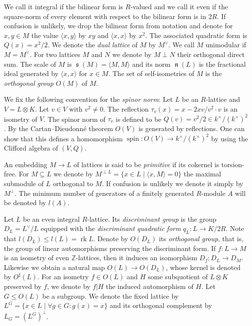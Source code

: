 \documentclass[a4paper]{amsart}
\theoremstyle{definition}
\theoremstyle{plain}
\DeclareMathOperator{\rk}{rk}
\DeclareMathOperator{\scale}{\mathfrak{s}}
\DeclareMathOperator{\norm}{\mathfrak{n}}
\newcommand{\ZZ}{\mathbb{Z}}
\newcommand{\disc}[1]{{D_{#1}}}
\DeclareMathOperator{\spin}{spin}
\newcommand{\sprodb}[2]{\langle #1, #2 \rangle}
\newcommand{\sprodbq}[1]{\langle #1, #1 \rangle}
\begin{document}
We call it integral if the bilinear form is $R$-valued and we call it even if the square-norm of every element with respect to the bilinear form is in $2 R$. 
If confusion is unlikely, we drop the bilinear form from notation and denote for $x,y \in M$ the value
$\sprodb{x}{y}$ by $xy$ and $\sprodbq{x}$ by $x^2$.
The associated quadratic form is $Q(x) = x^2/2$.
We denote the \emph{dual lattice} of $M$ by $M^\vee$. We call $M$ unimodular if $M=M^\vee$.
For two lattices $M$ and $N$ we denote by $M\perp N$ their orthogonal direct sum.
The scale of $M$ is $\scale(M)=\sprodb{M}{M}$
and its norm $\norm(L)$
is the fractional ideal generated by $\sprodbq{x}$ for $x \in M$.
%
%
%
%
%
%
The set of self-isometries of $M$ is the \emph{orthogonal group} $O(M)$ of $M$.

We fix the following convention for the \emph{spinor norm}: Let $L$ be an $R$-lattice and $V = L \otimes K$. Let $v \in V$ with $v^2 \neq 0$. The reflection $\tau_v(x) = x - 2xv/v^2\cdot v$ is an isometry of $V$.
The spinor norm of $\tau_v$ is defined to be $Q(v)=v^2/2 \in k^\times/(k^\times)^2$.
By the Cartan--Dieudonn\'e theorem $O(V)$ is generated by reflections.
One can show that this defines a homomorphism $\spin: O(V) \to k^\times/(k^\times)^2$ by using the Clifford algebra of $(V,Q)$.

An embedding $M \to L$ of lattices is said to be \emph{primitive} if its cokernel is torsion-free. For $M\subseteq L$ we denote by $M^{\perp L}=\{x \in L \mid \sprodb{x}{M}=0\}$ the maximal submodule of $L$ orthogonal to $M$. If confusion is unlikely we denote it simply by $M^\perp$.
The minimum number of generators of a finitely generated $R$-module $A$ will be denoted by $l(A)$.

Let $L$ be an even integral $R$-lattice. Its \emph{discriminant group} is the group $D_L = L^\vee/ L$ equipped with the \emph{discriminant quadratic form}
$q_L\colon L \to K/2 R$.
Note that $l(\disc{L})\leq l(L)=\rk L$.
Denote by $O(D_L)$ its \emph{orthogonal group}, that is, the group of linear automorphisms preserving the discriminant form.
If $f \colon L \to M$ is an isometry of even $\ZZ$-lattices, then it induces an isomorphism $D_f \colon D_L \to D_M$.
Likewise we obtain a natural map $O(L) \to O(D_L)$, whose kernel is denoted by $O^\sharp(L)$. For an isometry $f \in O(L)$ and $H$ some subquotient of $L \otimes K$ preserved by $f$, we denote by $f|H$ the induced automorphism of $H$.
Let $G\leq O(L)$ be a subgroup. We denote the fixed lattice by $L^G=\{x \in L \mid \forall g \in G \colon g(x)=x \}$ and its orthogonal complement by $L_G=(L^G)^\perp$.
\end{document}
